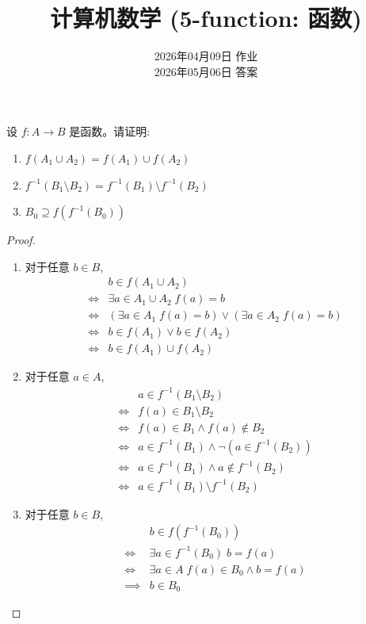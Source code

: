\documentclass[a4paper, justified]{tufte-handout}
\title{计算机数学 (5-function: 函数)}
\date{2026年04月09日 \quad 作业 \\ 2026年05月06日 \quad 答案}
\begin{document}
\maketitle
\noplagiarism %

\begin{problem}[$f$ 与 $f^{-1}$]
  设 $f: A \to B$ 是函数。请证明:
  \begin{enumerate}[(1)]
    \item $f(A_1 \cup A_2) = f(A_1) \cup f(A_2)$
    \item $f^{-1}(B_1 \setminus B_2) = f^{-1}(B_1) \setminus f^{-1}(B_2)$
    \item $B_0 \supseteq f(f^{-1}(B_0))$
  \end{enumerate}
\end{problem}

\begin{proof}
  \begin{enumerate}[(1)]
    \item 对于任意 $b \in B$,
      \begin{align*}
        &b \in f(A_{1} \cup A_{2}) \\
        \iff & \exists a \in A_{1} \cup A_{2}\; f(a) = b \\
        \iff & (\exists a \in A_{1}\; f(a) = b) \lor (\exists a \in A_{2}\; f(a) = b) \\
        \iff & b \in f(A_{1}) \lor b \in f(A_{2}) \\
        \iff & b \in f(A_{1}) \cup f({A_{2}})
      \end{align*}
    \item 对于任意 $a \in A$,
      \setcounter{equation}{0}
      \begin{align*}
        &a \in f^{-1}(B_{1} \setminus B_{2}) \\
        \iff & f(a) \in B_{1} \setminus B_{2} \\
        \iff & f(a) \in B_{1} \land f(a) \notin B_{2} \\
        \iff & a \in f^{-1}(B_{1}) \land \lnot(a \in f^{-1}(B_{2})) \\
        \iff & a \in f^{-1}(B_{1}) \land a \notin f^{-1}(B_{2}) \\
        \iff & a \in f^{-1}(B_{1}) \setminus f^{-1}(B_{2})
      \end{align*}
    \item 对于任意 $b \in B$,
      \setcounter{equation}{0}
      \begin{align*}
        &b \in f(f^{-1}(B_{0})) \\
        \iff & \exists a \in f^{-1}(B_{0})\; b = f(a) \\
        \iff & \exists a \in A\; f(a) \in B_{0} \land b = f(a) \\
        \implies & b \in B_{0}
      \end{align*}
  \end{enumerate}
\end{proof}
\end{document}
